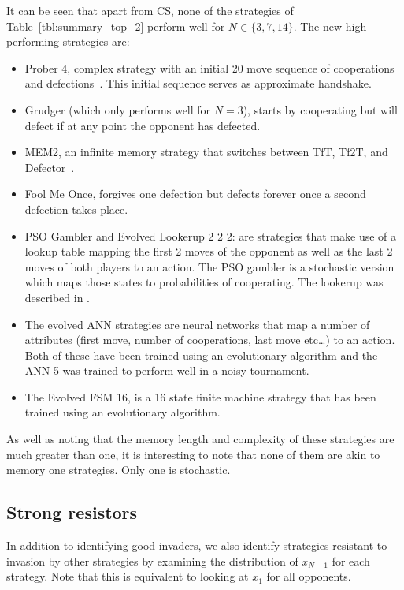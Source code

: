 \documentclass{article}
\begin{document}
It can be seen that apart from CS, none of the strategies
of Table~\ref{tbl:summary_top_2} perform well for \(N\in\{3, 7, 14\}\). The new
high performing strategies are:

\begin{itemize}
    \item Prober 4, complex strategy with an initial 20 move sequence of
        cooperations and defections~\cite{prison}. This initial sequence serves
        as approximate handshake.
    \item Grudger (which only performs well for \(N=3\)), starts by cooperating
        but will defect if at any point the opponent has defected.
    \item MEM2, an infinite memory strategy that switches between TfT, Tf2T, and
        Defector~\cite{Li2014}.
    \item Fool Me Once, forgives one defection but defects forever once a second
        defection takes place.
    \item  PSO Gambler and Evolved Lookerup 2 2 2: are strategies that make use
        of a lookup table mapping the first 2 moves of the opponent as well as
        the last 2 moves of both players to an action. The PSO gambler is a
        stochastic version which maps those states to probabilities of
        cooperating. The lookerup was described in \cite{Knight2016}.
	\item The evolved ANN strategies are neural networks that map a number of
		attributes (first move, number of cooperations, last move etc\dots) to
		an action. Both of these have been trained using an evolutionary
		algorithm and the ANN 5 was trained to perform well in a noisy
		tournament.
	\item The Evolved FSM 16, is a 16 state finite machine strategy that has
		been trained using an evolutionary algorithm.
\end{itemize}

As well as noting that the memory length and complexity of these strategies are
much greater than one, it is interesting to note that none of them are akin to
memory one strategies. Only one is stochastic.

\subsection{Strong resistors}\label{sec:strong_resistors}

In addition to identifying good invaders, we also identify strategies
resistant to invasion by other strategies by examining the distribution
of $x_{N-1}$ for each strategy. Note that this is equivalent to
looking at $x_1$ for all opponents.
\end{document}
